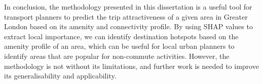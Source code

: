 
In conclusion, the methodology presented in this dissertation is a useful tool for transport planners to predict the trip attractiveness of a given area in Greater London based on its amenity and connectivity profile. By using SHAP values to extract local importance, we can identify destination hotspots based on the amenity profile of an area, which can be useful for local urban planners to identify areas that are popular for non-commute activities. However, the methodology is not without its limitations, and further work is needed to improve its generalisability and applicability.

